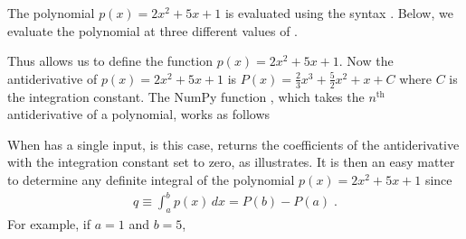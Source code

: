 \documentclass[letterpaper,10pt,english]{sphinxmanual}
\begin{document}
\begin{sphinxVerbatim}[commandchars=\\\{\}]
  \PYG{p}{[}  \PYG{p}{]}

\PYG{p}{[}  \PYG{p}{]}
\end{sphinxVerbatim}

\sphinxAtStartPar
The polynomial \(p(x) = 2x^2 + 5x +1\) is evaluated using the syntax .  Below, we evaluate the polynomial at three different values of .

\begin{sphinxVerbatim}[commandchars=\\\{\}]
  
  
\end{sphinxVerbatim}

\sphinxAtStartPar
Thus  allows us to define the function \(p(x) = 2x^2 + 5x +1\).  Now the antiderivative of \(p(x) = 2x^2 + 5x +1\) is \(P(x) = \frac{2}{3}x^3 + \frac{5}{2}x^2 +x+C\) where \(C\) is the integration constant.  The NumPy function , which takes the \(n^\mathrm{th}\) antiderivative of a polynomial, works as follows

\begin{sphinxVerbatim}[commandchars=\\\{\}]
  

\PYG{p}{[}                        \PYG{p}{]}
\end{sphinxVerbatim}

\sphinxAtStartPar
When  has a single input,  is this case,  returns the coefficients of the antiderivative with the integration constant set to zero, as  illustrates.  It is then an easy matter to determine any definite integral of the polynomial \(p(x) = 2x^2 + 5x +1\) since
\begin{equation*}
\begin{split}q \equiv \int_a^b p(x)\, dx = P(b) - P(a) \;.\end{split}
\end{equation*}
\sphinxAtStartPar
For example, if \(a=1\) and \(b=5\),
\end{document}
